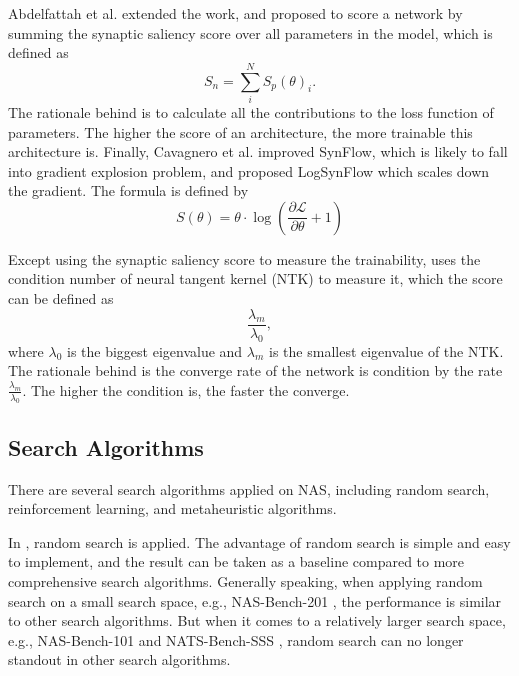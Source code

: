 \documentclass[sigconf]{acmart}
\begin{document}
    Abdelfattah et al. \cite{abdelfattah2021zerocost} extended the work, and proposed to score a 
    network by summing the synaptic saliency score over all parameters in the model, which is 
    defined as 
    \begin{equation}
        \label{equ:zero_cost}
        S_n=\sum^N_i S_p(\theta)_i.
    \end{equation}
    The rationale behind is to calculate all the contributions to the loss function of parameters. 
    The higher the score of an architecture, the more trainable this architecture is. 
    Finally, Cavagnero et al. \cite{Cavagnero_2023} improved SynFlow, which is likely to fall into 
    gradient explosion problem, and proposed LogSynFlow which scales down the gradient. 
    The formula is defined by 
    \begin{equation}
        \label{equ:logsynflow}
        S(\theta)=\theta\cdot\log(\frac{\partial \mathcal L}{\partial \theta}+1)
    \end{equation}

    Except using the synaptic saliency score to measure the trainability, 
    \cite{https://doi.org/10.48550/arxiv.2102.11535} uses the condition number of neural tangent 
    kernel (NTK) \cite{jacot2020neural} to measure it, which the score can be defined as 
    \begin{equation}
        \label{equ:cn_ntk}
        \frac{\lambda_m}{\lambda_0}, 
    \end{equation}
    where $\lambda_0$ is the biggest eigenvalue and $\lambda_m$ is the smallest eigenvalue of the 
    NTK. The rationale behind is the converge rate of the network is condition by the rate 
    $\frac{\lambda_m}{\lambda_0}$. The higher the condition is, the faster the converge. 

    \subsection{Search Algorithms}
    
    There are several search algorithms applied on NAS, including random search, reinforcement learning, and
    metaheuristic algorithms. 
    
    In \cite{https://doi.org/10.48550/arxiv.2006.04647} \cite{Lopes_2021}, random search is applied. 
    The advantage of random search is simple and easy to implement, and the result can be taken as a 
    baseline compared to more comprehensive search algorithms. Generally speaking, when applying random 
    search on a small search space, e.g., NAS-Bench-201 \cite{dong2020nasbench201}, the performance is 
    similar to other search algorithms. But when it comes to a relatively larger search space, e.g., NAS-Bench-101 
    \cite{ying2019nasbench101} and NATS-Bench-SSS \cite{Dong_2021}, random search can no longer standout 
    in other search algorithms. 
\end{document}
